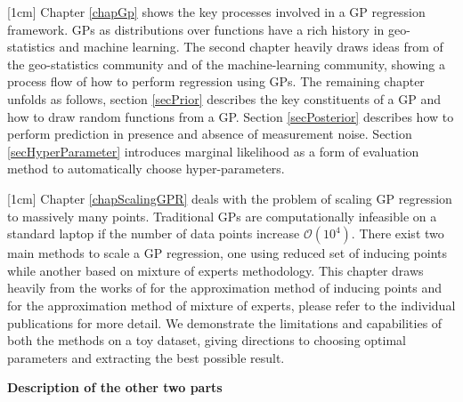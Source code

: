 [1cm]
Chapter \ref{chapGp} shows the key processes involved in a GP regression framework. GPs as distributions over functions have a rich history in geo-statistics and machine learning. The second chapter heavily draws ideas from \cite{krige1951statistical, matheron1963principles} of the geo-statistics community and \cite{Stein1999Springer, kennedy2000predicting, Rasmussen2005, mackay2003information} of the machine-learning community, showing a process flow of how to perform regression using GPs. The remaining chapter unfolds as follows, section \ref{secPrior} describes the key constituents of a GP and how to draw random functions from a GP. Section \ref{secPosterior} describes how to perform prediction in presence and absence of measurement noise. Section \ref{secHyperParameter} introduces marginal likelihood as a form of evaluation method to automatically choose hyper-parameters. 

[1cm]
Chapter \ref{chapScalingGPR} deals with the problem of scaling GP regression to massively many points. Traditional GPs are computationally infeasible on a standard laptop if the number of data points increase $\mathcal{O}(10^4)$. There exist two main methods to scale a GP regression, one using reduced set of inducing points while another based on mixture of experts methodology. This chapter draws heavily from the works of \cite{quinonero2005unifying, seeger2003fast, Snelson06sparsegaussian, Titsias09variationallearning} for the approximation method of inducing points and \cite{cao2014generalized, tresp2000bayesian, chen2009bagging, deisenroth2015distributed} for the approximation method of mixture of experts, please refer to the individual publications for more detail. We demonstrate the limitations and capabilities of both the methods on a toy dataset, giving directions to choosing optimal parameters and extracting the best possible result.  

\textbf{Description of the other two parts}

